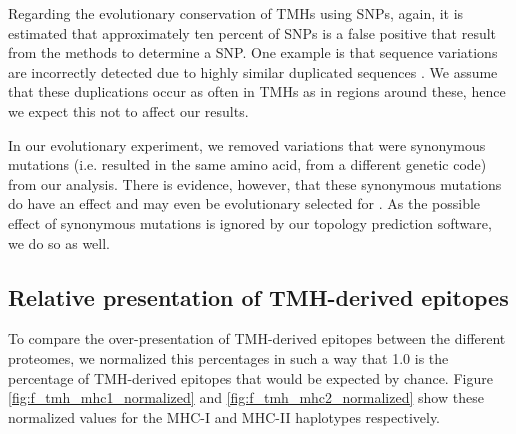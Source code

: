 Regarding the evolutionary conservation of TMHs using SNPs,
again, it is estimated that approximately ten percent
of SNPs is a false positive that result from the methods to determine
a SNP. One example is that sequence variations are incorrectly
detected due to highly similar duplicated sequences \cite{musumeci2010single}.
We assume that these duplications occur as often in TMHs as in
regions around these, hence we expect this not to affect our results.

%
In our evolutionary experiment, 
we removed variations that were synonymous mutations (i.e.
resulted in the same amino acid, from a different genetic code) 
from our analysis.
There is evidence, however, that these synonymous mutations
do have an effect and may even be evolutionary selected 
for \cite{hunt2009silent}.
As the possible effect of synonymous mutations is ignored by our
topology prediction software, we do so as well.

\clearpage

\subsection{Relative presentation of TMH-derived epitopes}

To compare the over-presentation of TMH-derived epitopes between the
different proteomes, we normalized this percentages in such a
way that 1.0 is the percentage of TMH-derived epitopes that would 
be expected by chance. 
Figure \ref{fig:f_tmh_mhc1_normalized} and \ref{fig:f_tmh_mhc2_normalized}
show these normalized values for the MHC-I and MHC-II haplotypes respectively.

